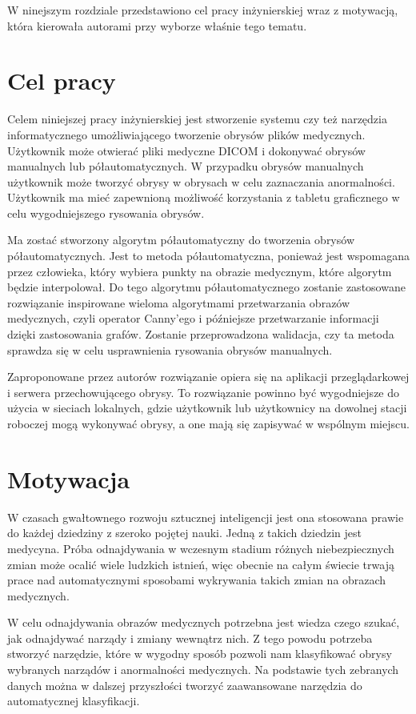 \documentclass[a4paper,11pt,twoside,openright]{report}
\theoremstyle{definition}
\begin{document}
W ninejszym rozdziale przedstawiono cel pracy inżynierskiej wraz z motywacją, która kierowała autorami przy wyborze właśnie tego tematu.

\section*{Cel pracy}

Celem niniejszej pracy inżynierskiej jest stworzenie systemu czy też narzędzia informatycznego umożliwiającego tworzenie obrysów plików medycznych. Użytkownik może otwierać pliki medyczne DICOM i dokonywać obrysów manualnych lub półautomatycznych. W przypadku obrysów manualnych użytkownik może tworzyć obrysy w obrysach w celu zaznaczania anormalności. Użytkownik ma mieć zapewnioną możliwość korzystania z tabletu graficznego w celu wygodniejszego rysowania obrysów.

Ma zostać stworzony algorytm półautomatyczny do tworzenia obrysów półautomatycznych. Jest to metoda półautomatyczna, ponieważ jest wspomagana przez człowieka, który wybiera punkty na obrazie medycznym, które algorytm będzie interpolował. Do tego algorytmu półautomatycznego zostanie zastosowane rozwiązanie inspirowane wieloma algorytmami przetwarzania obrazów medycznych, czyli operator Canny'ego i późniejsze przetwarzanie informacji dzięki zastosowania grafów. Zostanie przeprowadzona walidacja, czy ta metoda sprawdza się w celu usprawnienia rysowania obrysów manualnych.

Zaproponowane przez autorów rozwiązanie opiera się na aplikacji przeglądarkowej i serwera przechowującego obrysy. To rozwiązanie powinno być wygodniejsze do użycia w sieciach lokalnych, gdzie użytkownik lub użytkownicy na dowolnej stacji roboczej mogą wykonywać obrysy, a one mają się zapisywać w wspólnym miejscu.

\section*{Motywacja}

W czasach gwałtownego rozwoju sztucznej inteligencji jest ona stosowana prawie do każdej dziedziny z szeroko pojętej nauki. Jedną z takich dziedzin jest medycyna. Próba odnajdywania w wczesnym stadium różnych niebezpiecznych zmian może ocalić wiele ludzkich istnień, więc obecnie na całym świecie trwają prace nad automatycznymi sposobami wykrywania takich zmian na obrazach medycznych.

W celu odnajdywania obrazów medycznych potrzebna jest wiedza czego szukać, jak odnajdywać narządy i zmiany wewnątrz nich. Z tego powodu potrzeba stworzyć narzędzie, które w wygodny sposób pozwoli nam klasyfikować obrysy wybranych narządów i anormalności medycznych. Na podstawie tych zebranych danych można w dalszej przyszłości tworzyć zaawansowane narzędzia do automatycznej klasyfikacji.
\end{document}
